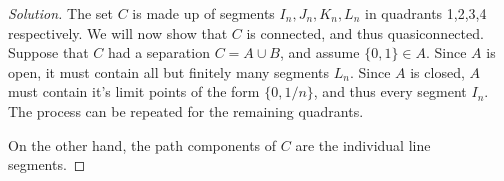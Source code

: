 \documentclass{article}
\theoremstyle{definition}
\begin{document}
\begin{proof}[Solution]
  The set $C$ is made up of segments $I_n, J_n, K_n, L_n$ in quadrants 1,2,3,4 respectively. We will now show that $C$ is connected, and thus quasiconnected. Suppose that $C$ had a separation $C = A\cup B$, and assume $\{0,1\}\in A$. Since $A$ is open, it must contain all but finitely many segments $L_n$. Since $A$ is closed, $A$ must contain it's limit points of the form $\{0,1/n\}$, and thus every segment $I_n$. The process can be repeated for the remaining quadrants.

  On the other hand, the path components of $C$ are the individual line segments.
\end{proof}

\pagebreak
\end{document}
